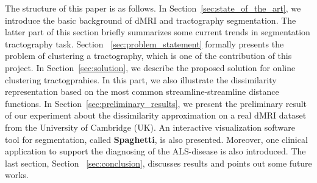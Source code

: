 %
%
%
%
The structure of this paper is as follows. In Section~\ref{sec:state_of_the_art}, we introduce the basic background of dMRI and tractography segmentation. The latter part of this section briefly summarizes some current trends in segmentation tractography task. Section ~\ref{sec:problem_statement} formally presents the problem of clustering a tractography, which is one of the contribution of this project. In Section~\ref{sec:solution}, we describe the proposed solution for online clustering tractogprahies. In this part, we also illustrate the dissimilarity representation based on the most common streamline-streamline distance functions. In Section~\ref{sec:preliminary_results}, we present the preliminary result of our experiment about the dissimilarity approximation on a real dMRI dataset from the University of Cambridge (UK). An interactive visualization software tool for segmentation, called \textbf{Spaghetti}, is also presented. Moreover, one clinical application to support the diagnosing of the ALS-disease is also introduced. %
The last section, Section ~\ref{sec:conclusion}, discusses results
and points out some future works.%
